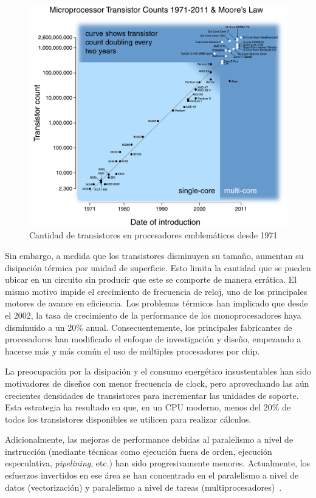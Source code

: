 \begin{figure}[htbp]
   \centering
   \includegraphics[width=\textwidth]{images/moore-law.pdf}
   \caption{Cantidad de transistores en procesadores emblem\'aticos desde 1971}
   \label{moore-law}
\end{figure}

Sin embargo, a medida que los transistores disminuyen su tama\~no, aumentan su disipaci\'on t\'ermica por unidad de superficie.
Esto limita la cantidad que se pueden ubicar en un circuito sin producir que este se comporte de manera err\'atica.
El mismo motivo impide el crecimiento de frecuencia de reloj, uno de los principales motores de avance en eficiencia.
Los problemas t\'ermicos han implicado que desde el 2002, la tasa de crecimiento de la performance de los monoprocesadores haya disminuido a un 20\% anual.
Consecuentemente, los principales fabricantes de procesadores han modificado el enfoque de investigaci\'on y dise\~no, empezando a hacerse m\'as y m\'as com\'un el uso de m\'ultiples procesadores por chip.

La preocupaci\'on por la disipaci\'on y el consumo energ\'etico insustentables han sido motivadores de dise\~nos con menor frecuencia de clock, pero aprovechando las a\'un crecientes densidades de transistores para incrementar las unidades de soporte.
Esta estrategia ha resultado en que, en un CPU moderno, menos del 20\% de todos los transistores disponibles se utilicen para realizar c\'alculos.

Adicionalmente, las mejoras de performance debidas al paralelismo a nivel de instrucci\'on (mediante t\'ecnicas como ejecuci\'on fuera de orden, ejecuci\'on especulativa, \textit{pipelining}, etc.) han sido progresivamente menores.
Actualmente, los esfuerzos invertidos en ese \'area se han concentrado en el paralelismo a nivel de datos (vectorizaci\'on) y paralelismo a nivel de tareas (multiprocesadores)~\cite{HennessyPatterson}.

